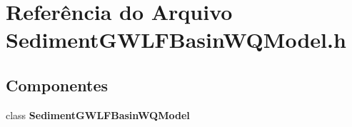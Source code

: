 \section{Referência do Arquivo Sediment\+G\+W\+L\+F\+Basin\+W\+Q\+Model.\+h}
\label{_sediment_g_w_l_f_basin_w_q_model_8h}
\subsection*{Componentes}
\begin{DoxyCompactItemize}
\item 
class {\bf Sediment\+G\+W\+L\+F\+Basin\+W\+Q\+Model}
\end{DoxyCompactItemize}
